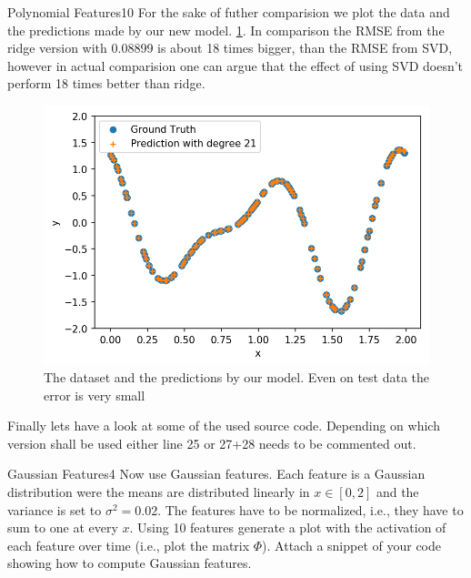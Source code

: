 \begin{questions}
\begin{question}{Polynomial Features}{10}
For the sake of futher comparision we plot the data and the predictions made by our new model. \ref{fig:pinv3}. In comparison the RMSE from the ridge version with 0.08899 is about 18 times bigger, than the RMSE from SVD, however in actual comparision one can argue that the effect of using SVD doesn't perform 18 times better than ridge. 
\begin{figure}[H]
	\includegraphics[width=0.6\linewidth]{pictures/groundTruth_polynomial_21.png}
	\centering
	\caption{The dataset and the predictions by our model. Even on test data the error is very small}
	\label{fig:pinv3}
\end{figure}

Finally lets have a look at some of the used source code. Depending on which version shall be used either line 25 or 27+28 needs to be commented out.


\end{question}


\begin{question}{Gaussian Features}{4}
Now use Gaussian features. Each feature is a Gaussian distribution were the means are distributed linearly in $x \in[0,2]$ and the variance is set to $\sigma^2=0.02$. The features have to be normalized, i.e., they have to sum to one at every $x$. Using 10 features generate a plot with the activation of each feature over time (i.e., plot the matrix $\Phi$). Attach a snippet of your code showing how to compute Gaussian features.


\end{question}
\end{questions}
